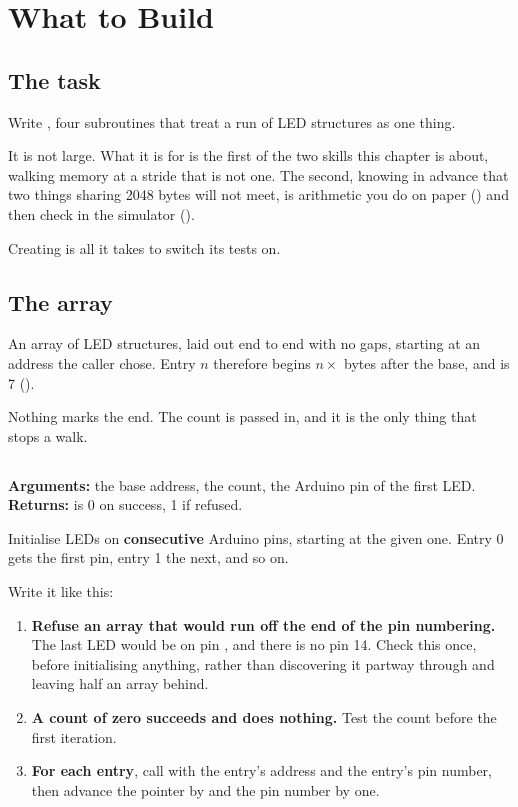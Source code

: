 
\section{What to Build}
\label{c4:sec:build}

\subsection{The task}
\label{c4:sec:task}
Write , four subroutines that treat a run of LED structures as
one thing.

It is not large. What it is for is the first of the two skills this chapter is about, walking
memory at a stride that is not one. The second, knowing in advance that two things sharing 2048
bytes will not meet, is arithmetic you do on paper () and then check in the
simulator ().

Creating  is all it takes to switch its tests on.

\subsection{The array}
\label{c4:sec:array}
An array of  LED structures, laid out end to end with no gaps, starting at an address
the caller chose. Entry $n$ therefore begins $n \times$  bytes after the base, and
 is 7 ().

Nothing marks the end. The count is passed in, and it is the only thing that stops a walk.

\subsection{}
\label{c4:sec:init}
\noindent\textbf{Arguments:}  the base address,  the count,  the
Arduino pin of the first LED.\\
\textbf{Returns:}  is 0 on success, 1 if refused.

\medskip
Initialise  LEDs on \textbf{consecutive} Arduino pins, starting at the given one.
Entry 0 gets the first pin, entry 1 the next, and so on.

\noindent Write it like this:
\begin{enumerate}
  \item \textbf{Refuse an array that would run off the end of the pin numbering.} The last LED
    would be on pin , and there is no pin 14. Check this once, before
    initialising anything, rather than discovering it partway through and leaving half an array
    behind.
  \item \textbf{A count of zero succeeds and does nothing.} Test the count before the first
    iteration.
  \item \textbf{For each entry}, call  with the entry's address and the entry's pin
    number, then advance the pointer by  and the pin number by one.
\end{enumerate}

